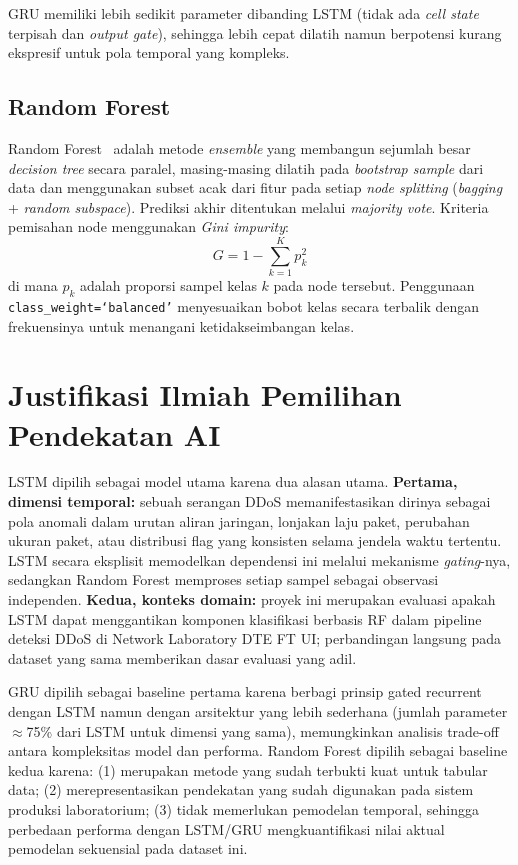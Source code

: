 \documentclass[11pt,a4paper,oneside]{report}
\begin{document}
GRU memiliki lebih sedikit parameter dibanding LSTM (tidak ada \textit{cell state} terpisah dan \textit{output gate}), sehingga lebih cepat dilatih namun berpotensi kurang ekspresif untuk pola temporal yang kompleks.

\subsection*{Random Forest}

Random Forest~\cite{breiman2001} adalah metode \textit{ensemble} yang membangun sejumlah besar \textit{decision tree} secara paralel, masing-masing dilatih pada \textit{bootstrap sample} dari data dan menggunakan subset acak dari fitur pada setiap \textit{node splitting} (\textit{bagging} + \textit{random subspace}). Prediksi akhir ditentukan melalui \textit{majority vote}. Kriteria pemisahan node menggunakan \textit{Gini impurity}:
\[
G = 1 - \sum_{k=1}^{K} p_k^2
\]
di mana $p_k$ adalah proporsi sampel kelas $k$ pada node tersebut. Penggunaan \texttt{class\_weight=`balanced'} menyesuaikan bobot kelas secara terbalik dengan frekuensinya untuk menangani ketidakseimbangan kelas.

\section{Justifikasi Ilmiah Pemilihan Pendekatan AI}

LSTM dipilih sebagai model utama karena dua alasan utama. \textbf{Pertama, dimensi temporal:} sebuah serangan DDoS memanifestasikan dirinya sebagai pola anomali dalam urutan aliran jaringan, lonjakan laju paket, perubahan ukuran paket, atau distribusi flag yang konsisten selama jendela waktu tertentu. LSTM secara eksplisit memodelkan dependensi ini melalui mekanisme \textit{gating}-nya, sedangkan Random Forest memproses setiap sampel sebagai observasi independen. \textbf{Kedua, konteks domain:} proyek ini merupakan evaluasi apakah LSTM dapat menggantikan komponen klasifikasi berbasis RF dalam pipeline deteksi DDoS di Network Laboratory DTE FT UI; perbandingan langsung pada dataset yang sama memberikan dasar evaluasi yang adil.

GRU dipilih sebagai baseline pertama karena berbagi prinsip gated recurrent dengan LSTM namun dengan arsitektur yang lebih sederhana (jumlah parameter $\approx$75\% dari LSTM untuk dimensi yang sama), memungkinkan analisis trade-off antara kompleksitas model dan performa. Random Forest dipilih sebagai baseline kedua karena: (1) merupakan metode yang sudah terbukti kuat untuk tabular data; (2) merepresentasikan pendekatan yang sudah digunakan pada sistem produksi laboratorium; (3) tidak memerlukan pemodelan temporal, sehingga perbedaan performa dengan LSTM/GRU mengkuantifikasi nilai aktual pemodelan sekuensial pada dataset ini.
\end{document}
